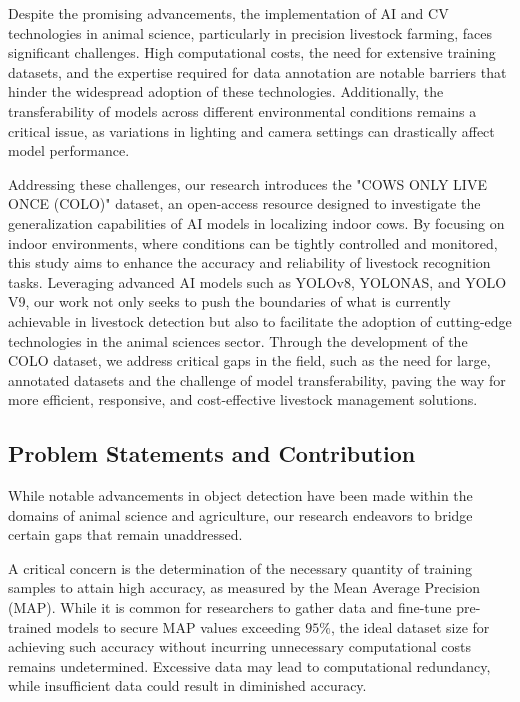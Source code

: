 Despite the promising advancements, the implementation of AI and CV technologies in animal science, particularly in precision livestock farming, faces significant challenges. High computational costs, the need for extensive training datasets, and the expertise required for data annotation are notable barriers that hinder the widespread adoption of these technologies. Additionally, the transferability of models across different environmental conditions remains a critical issue, as variations in lighting and camera settings can drastically affect model performance.

Addressing these challenges, our research introduces the "COWS ONLY LIVE ONCE (COLO)" dataset, an open-access resource designed to investigate the generalization capabilities of AI models in localizing indoor cows. By focusing on indoor environments, where conditions can be tightly controlled and monitored, this study aims to enhance the accuracy and reliability of livestock recognition tasks. Leveraging advanced AI models such as YOLOv8, YOLONAS, and YOLO V9, our work not only seeks to push the boundaries of what is currently achievable in livestock detection but also to facilitate the adoption of cutting-edge technologies in the animal sciences sector. Through the development of the COLO dataset, we address critical gaps in the field, such as the need for large, annotated datasets and the challenge of model transferability, paving the way for more efficient, responsive, and cost-effective livestock management solutions.


\subsection{Problem Statements and Contribution}
While notable advancements in object detection have been made within the domains of animal science and agriculture, our research endeavors to bridge certain gaps that remain unaddressed.

A critical concern is the determination of the necessary quantity of training samples to attain high accuracy, as measured by the Mean Average Precision (MAP). While it is common for researchers to gather data and fine-tune pre-trained models to secure MAP values exceeding $95\%$, the ideal dataset size for achieving such accuracy without incurring unnecessary computational costs remains undetermined. Excessive data may lead to computational redundancy, while insufficient data could result in diminished accuracy.

